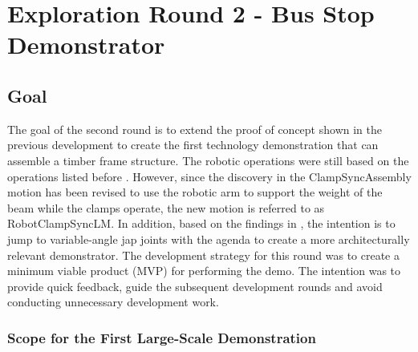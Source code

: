 \chapter{Exploration Round 2 - Bus Stop Demonstrator}
\label{chapter:exploration-round-2}

\section{Goal}
\label{section:exploration-2-goal}

The goal of the second round is to extend the proof of concept shown in the previous development to create the first technology demonstration that can assemble a timber frame structure. The robotic operations were still based on the operations listed before . However, since the discovery in  the ClampSyncAssembly motion has been revised to use the robotic arm to support the weight of the beam while the clamps operate, the new motion is referred to as RobotClampSyncLM.
In addition, based on the findings in , the intention is to jump to variable-angle jap joints with the agenda to create a more architecturally relevant demonstrator. 
The development strategy for this round was to create a minimum viable product (MVP) for performing the demo. The intention was to provide quick feedback, guide the subsequent development rounds and avoid conducting unnecessary development work. 

\subsection{Scope for the First Large-Scale Demonstration}
\label{subsection:exploration-2-scope-for-the-first-large-scale-demonstration}


